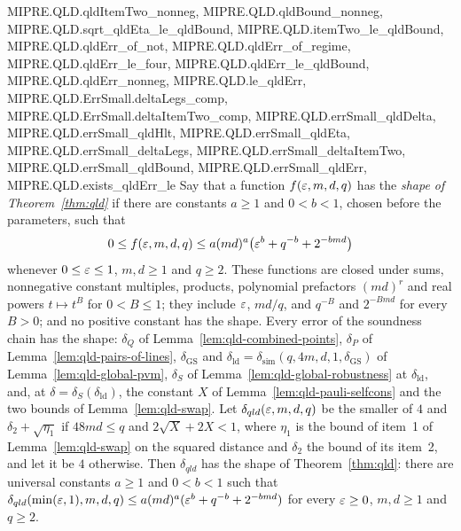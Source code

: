 \begin{lemma}
{  MIPRE.QLD.qldItemTwo_nonneg, MIPRE.QLD.qldBound_nonneg, MIPRE.QLD.sqrt_qldEta_le_qldBound,
  MIPRE.QLD.itemTwo_le_qldBound, MIPRE.QLD.qldErr_of_not, MIPRE.QLD.qldErr_of_regime,
  MIPRE.QLD.qldErr_le_four, MIPRE.QLD.qldErr_le_qldBound, MIPRE.QLD.qldErr_nonneg,
  MIPRE.QLD.le_qldErr, MIPRE.QLD.ErrSmall.deltaLegs_comp, MIPRE.QLD.ErrSmall.deltaItemTwo_comp,
  MIPRE.QLD.errSmall_qldDelta, MIPRE.QLD.errSmall_qldHlt, MIPRE.QLD.errSmall_qldEta,
  MIPRE.QLD.errSmall_deltaLegs, MIPRE.QLD.errSmall_deltaItemTwo, MIPRE.QLD.errSmall_qldBound,
  MIPRE.QLD.errSmall_qldErr, MIPRE.QLD.exists_qldErr_le}
\leanok
Say that a function $f(\varepsilon, m, d, q)$ has the \emph{shape of Theorem~\ref{thm:qld}} if there are
constants $a \geq 1$ and $0 < b < 1$, chosen before the parameters, such that
\begin{equation*}
  0 \leq f(\varepsilon, m, d, q) \leq a (md)^a \bigl( \varepsilon^b + q^{-b} + 2^{-bmd} \bigr)
\end{equation*}
whenever $0 \leq \varepsilon \leq 1$, $m, d \geq 1$ and $q \geq 2$. These functions are closed under sums,
nonnegative constant multiples, products, polynomial prefactors $(md)^r$ and real powers
$t \mapsto t^B$ for $0 < B \leq 1$; they include $\varepsilon$, $md/q$, and $q^{-B}$ and $2^{-Bmd}$ for
every $B > 0$; and no positive constant has the shape. Every error of the soundness chain has the
shape: $\delta_Q$ of Lemma~\ref{lem:qld-combined-points}, $\delta_P$ of
Lemma~\ref{lem:qld-pairs-of-lines}, $\delta_{\mathrm{GS}}$ and
$\delta_{\mathrm{ld}} = \delta_{\mathrm{sim}}(q, 4m, d, 1, \delta_{\mathrm{GS}})$ of
Lemma~\ref{lem:qld-global-pvm}, $\delta_S$ of Lemma~\ref{lem:qld-global-robustness} at
$\delta_{\mathrm{ld}}$, and, at $\delta = \delta_S(\delta_{\mathrm{ld}})$, the constant $X$ of
Lemma~\ref{lem:qld-pauli-selfcons} and the two bounds of Lemma~\ref{lem:qld-swap}. Let
$\delta_{qld}(\varepsilon, m, d, q)$ be the smaller of $4$ and $\delta_2 + \sqrt{\eta_1}$ if
$48md \leq q$ and $2\sqrt{X} + 2X < 1$, where $\eta_1$ is the bound of item~1 of
Lemma~\ref{lem:qld-swap} on the squared distance and $\delta_2$ the bound of its item~2, and let it
be $4$ otherwise. Then $\delta_{qld}$ has the shape of Theorem~\ref{thm:qld}: there are
universal constants $a \geq 1$ and $0 < b < 1$ such that
$\delta_{qld}(\min(\varepsilon, 1), m, d, q) \leq a (md)^a (\varepsilon^b + q^{-b} + 2^{-bmd})$ for every
$\varepsilon \geq 0$, $m, d \geq 1$ and $q \geq 2$.
\end{lemma}

